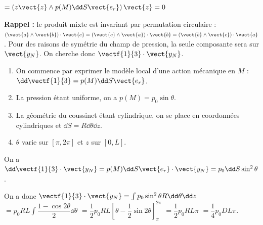\begin{corrigebox}
$ = \left(z\vect{z} \wedge  p(M) \dd S \vect{e_r}\right) \vect{z} = 0$

\textbf{Rappel :} le produit mixte est invariant par permutation circulaire : $\left( \vect{a}\wedge \vect{b}\right)\cdot \vect{c} = \left( \vect{c}\wedge \vect{a}\right)\cdot \vect{b} = \left( \vect{b}\wedge \vect{c}\right)\cdot \vect{a}$.
Pour des raisons de symétrie du champ de pression, la seule composante sera sur $\vect{y_N}$.
On cherche donc $\vectf{1}{3} \cdot \vect{y_N}$.
\begin{enumerate}
\item On commence par exprimer le modèle local d'une action mécanique en $M$ : $\dd \vectf{1}{3} = p(M) \dd S \vect{e_r}$.
\item La pression étant uniforme, on a $p(M)=p_0 \sin\theta$.
\item La géométrie du coussinet étant cylindrique, on se place en coordonnées cylindriques et $\dd S = R\dd \theta \dd z$.  
\item $\theta$ varie sur $[\pi, 2\pi]$ et $z$ sur $[0,L]$. 
\end{enumerate}

On a  $\dd \vectf{1}{3} \cdot \vect{y_N} = p(M) \dd S \vect{e_r} \cdot \vect{y_N} =p_0 \dd S  \sin^2 \theta $. 

On a donc $\vectf{1}{3} \cdot \vect{y_N} = \int  p_0  \sin^2 \theta  R\dd \theta \dd z $
$ =   p_0 R L \int \dfrac{1-\cos 2\theta }{2}   \dd \theta$
$ =   \dfrac{1}{2}p_0 R L \left[\theta-\dfrac{1}{2}\sin 2\theta \right]^{2\pi}_{\pi} $
$ =   \dfrac{1}{2}p_0 R L {\pi} $
$ =   \dfrac{1}{4}p_0 D L {\pi} $.
\end{corrigebox}
